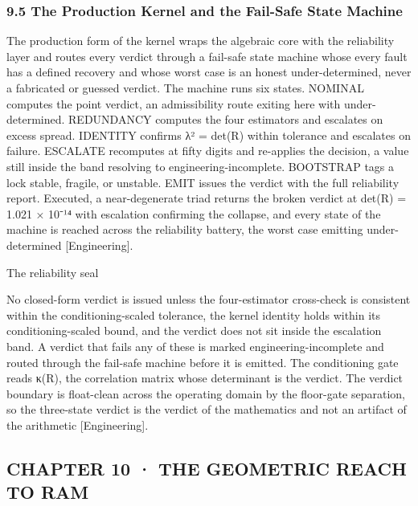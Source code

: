 \documentclass[10pt,twocolumn]{article}
\begin{document}
\hypertarget{the-production-kernel-and-the-fail-safe-state-machine}{%
\subsubsection{9.5 The Production Kernel and the Fail-Safe State
Machine}\label{the-production-kernel-and-the-fail-safe-state-machine}}

The production form of the kernel wraps the algebraic core with the
reliability layer and routes every verdict through a fail-safe state
machine whose every fault has a defined recovery and whose worst case is
an honest under-determined, never a fabricated or guessed verdict. The
machine runs six states. NOMINAL computes the point verdict, an
admissibility route exiting here with under-determined. REDUNDANCY
computes the four estimators and escalates on excess spread. IDENTITY
confirms λ² = det(R) within tolerance and escalates on failure. ESCALATE
recomputes at fifty digits and re-applies the decision, a value still
inside the band resolving to engineering-incomplete. BOOTSTRAP tags a
lock stable, fragile, or unstable. EMIT issues the verdict with the full
reliability report. Executed, a near-degenerate triad returns the broken
verdict at det(R) = 1.021 × 10⁻¹⁴ with escalation confirming the
collapse, and every state of the machine is reached across the
reliability battery, the worst case emitting under-determined
{[}Engineering{]}.

\begin{jbox}{The reliability seal}

No closed-form verdict is issued unless the four-estimator cross-check
is consistent within the conditioning-scaled tolerance, the kernel
identity holds within its conditioning-scaled bound, and the verdict
does not sit inside the escalation band. A verdict that fails any of
these is marked engineering-incomplete and routed through the fail-safe
machine before it is emitted. The conditioning gate reads κ(R), the
correlation matrix whose determinant is the verdict. The verdict
boundary is float-clean across the operating domain by the floor-gate
separation, so the three-state verdict is the verdict of the mathematics
and not an artifact of the arithmetic {[}Engineering{]}.

\end{jbox}

\hypertarget{chapter-10-the-geometric-reach-to-ram}{%
\subsection{CHAPTER 10 · THE GEOMETRIC REACH TO
RAM}\label{chapter-10-the-geometric-reach-to-ram}}
\end{document}
